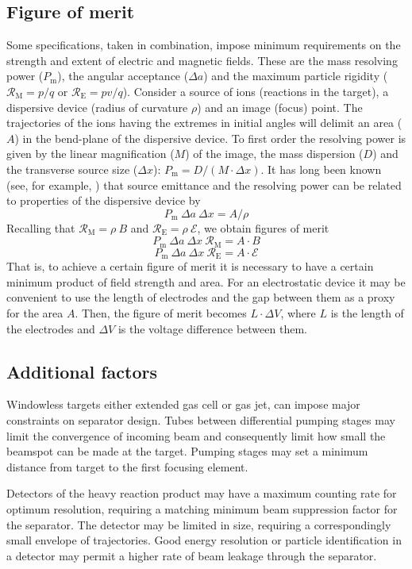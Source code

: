 \documentclass[12pt]{amsart}
\begin{document}
  \subsection{Figure of merit}
  Some specifications, taken in combination, impose minimum requirements on the strength and extent of electric and magnetic fields.   These are the mass resolving power ($P_\mathrm{m}$), the angular acceptance ($\Delta a$) and the maximum particle rigidity 
  ($\mathcal{R}_\mathrm{M}=p/q$ or $\mathcal{R}_\mathrm{E}=pv/q$).    
  Consider a source of ions (reactions in the target), a dispersive device  (radius of curvature $\rho$) and an image (focus) point.   The  trajectories of the ions having the extremes in initial angles will delimit an area ($A$)  in the bend-plane of the dispersive device.     To first order the resolving power is given by the linear magnification ($M$) of the image, the mass dispersion ($D$) and the transverse source size ($\Delta x$): 
  $P_\mathrm{m} = D/(M \cdot \Delta x) $. 
  It has long been known (see, for example, \cite{Wo71}) that source emittance and the resolving power can be related to properties of the dispersive device by
  \[ P_\mathrm{m}\  \Delta a\  \Delta x = A/\rho \]
  Recalling that 
  $\mathcal{R}_\mathrm{M}=\rho \ B$ and $\mathcal{R}_\mathrm{E}=\rho \ \mathcal{E}$,  we obtain  figures of merit 
  \[ P_\mathrm{m}\  \Delta a\  \Delta x \ \mathcal{R}_\mathrm{M} = A \cdot B \]
   \[P_\mathrm{m}\  \Delta a\  \Delta x \ \mathcal{R}_\mathrm{E} = A \cdot \mathcal{E} \]
   That is, to achieve a certain figure of merit it is necessary to have a certain minimum product of field strength and area.  For an electrostatic device it may be convenient to use the length of electrodes and the gap between them as a proxy for the area $A$.  Then, the figure of merit becomes $L\cdot\Delta V$, where $L$ is the length of the electrodes and $\Delta V$ is the voltage difference between them.

\subsection{Additional factors} 
  Windowless targets either extended gas cell or gas jet, can impose major constraints on separator design.  Tubes between differential pumping stages may limit the convergence of incoming beam and consequently limit how small the beamspot  can be made at the target.  Pumping stages may set a minimum distance from target to the first focusing element.

Detectors of the heavy reaction product may have a maximum counting rate for optimum resolution, requiring a matching minimum beam suppression factor for the separator.   The detector may be limited in size, requiring a correspondingly small envelope of trajectories.    Good energy resolution or particle identification in a detector may permit a higher rate of beam leakage through the separator.
\end{document}
